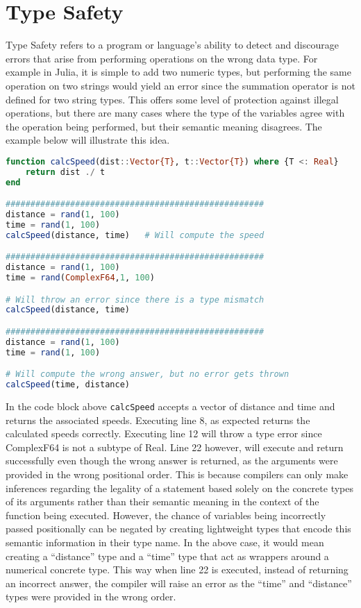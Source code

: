 \section{Type Safety}
Type Safety refers to a program or language's ability to detect and discourage errors that arise from performing
operations on the wrong data type. For example in Julia, it is simple to add two numeric types, but performing the same
operation on two strings would yield an error since the summation operator is not defined for two string types. This
offers some level of protection against illegal operations, but there are many cases where the type of the variables
agree with the operation being performed, but their semantic meaning disagrees. The example below will illustrate this
idea.
\begin{lstlisting}[language=Julia]
function calcSpeed(dist::Vector{T}, t::Vector{T}) where {T <: Real}
    return dist ./ t
end

#################################################### 
distance = rand(1, 100)
time = rand(1, 100)
calcSpeed(distance, time)   # Will compute the speed

#################################################### 
distance = rand(1, 100)
time = rand(ComplexF64,1, 100)

# Will throw an error since there is a type mismatch
calcSpeed(distance, time)  

#################################################### 
distance = rand(1, 100)
time = rand(1, 100)

# Will compute the wrong answer, but no error gets thrown
calcSpeed(time, distance) 
\end{lstlisting}
In the code block above \lstinline[language=Julia]{calcSpeed} accepts a vector of distance and time and returns the
associated speeds. Executing line 8, as expected returns the calculated speeds correctly. Executing line 12 will throw a
type error since ComplexF64 is not a subtype of Real. Line 22 however, will execute and return successfully even though
the wrong answer is returned, as the arguments were provided in the wrong positional order. This is because compilers
can only make inferences regarding the legality of a statement based solely on the concrete types of its arguments
rather than their semantic meaning in the context of the function being executed. However, the chance of variables being
incorrectly passed positionally can be negated by creating lightweight types that encode this semantic information in
their type name. In the above case, it would mean creating a ``distance'' type and a ``time'' type that act as wrappers
around a numerical concrete type. This way when line 22 is executed, instead of returning an incorrect answer, the
compiler will raise an error as the ``time'' and ``distance'' types were provided in the wrong order.